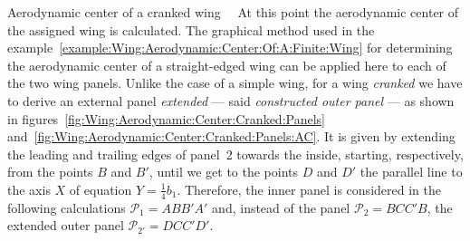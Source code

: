 \documentclass[[12pt,twoside]{book}
\begin{document}
\begin{myExampleX}{Aerodynamic center of a cranked wing}{\ \myIconGraph\ }
\medskip
At this point the aerodynamic center of the assigned wing is calculated.
The graphical method used in the example~\ref{example:Wing:Aerodynamic:Center:Of:A:Finite:Wing}
for determining the aerodynamic center of a straight-edged wing
can be applied here to each of the two wing panels.
Unlike the case of a simple wing, for a wing \emph{cranked} we have to derive
an external panel  \emph{extended} --- said \emph{constructed outer panel} --- as shown in
figures~\ref{fig:Wing:Aerodynamic:Center:Cranked:Panels}
and~\ref{fig:Wing:Aerodynamic:Center:Cranked:Panels:AC}. 
It is given by extending the leading and trailing edges
of panel~2 towards the inside,
starting, respectively, from the points $B$ and $B'$, until we get to the points $D$ and $D'$ the parallel line
to the axis $X$ of equation $Y=\frac{1}{4}b_1$.
Therefore, the inner panel is considered in the following calculations
$\mathcal{P}_1=ABB'A'$ and,
instead of the panel $\mathcal{P}_2=BCC'B$,
the extended outer panel $\mathcal{P}_{2'}=DCC'D'$.


\end{myExampleX}
\end{document}
